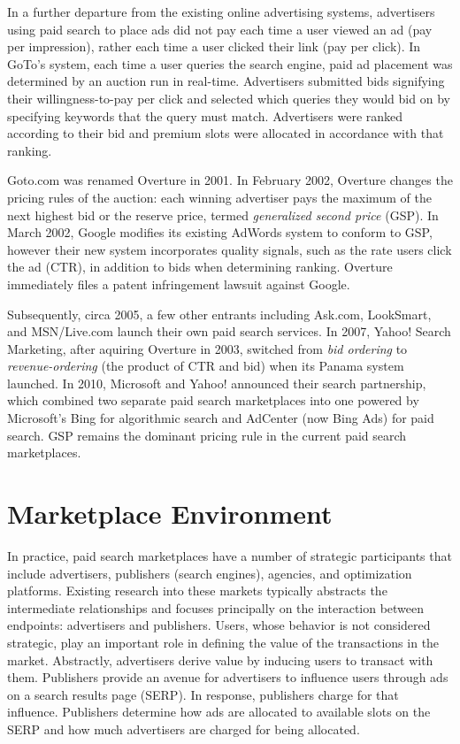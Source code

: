 \documentclass[prodmode,acmtist]{acmsmall} %
\begin{document}
In a further departure from the existing online advertising systems, advertisers using paid search to place ads did not pay each time a user viewed an ad (pay per impression), rather each time a user clicked their link (pay per click).
In GoTo's system, each time a user queries the search engine, paid ad placement was determined by an auction run in real-time.
Advertisers submitted bids signifying their willingness-to-pay per click and selected which queries they would bid on by specifying keywords that the query must match.
Advertisers were ranked according to their bid and premium slots were allocated in accordance with that ranking. 

Goto.com was renamed Overture in 2001.
In February 2002, Overture changes the pricing rules of the auction: each winning advertiser pays the maximum of the next highest bid or the reserve price, termed \emph{generalized second price} (GSP).
In March 2002, Google modifies its existing AdWords system to conform to GSP, however their new system incorporates quality signals, such as the rate users click the ad (CTR), in addition to bids when determining ranking. 
Overture immediately files a patent infringement lawsuit against Google.


Subsequently, circa 2005, a few other entrants including Ask.com, LookSmart, and MSN/Live.com launch their own paid search services.
In 2007, Yahoo! Search Marketing, after aquiring Overture in 2003, switched from \emph{bid ordering} to \emph{revenue-ordering} (the product of CTR and bid) when its Panama system launched. 
In 2010, Microsoft and Yahoo! announced their search partnership, which combined two separate paid search marketplaces into one powered by Microsoft's Bing for algorithmic search and AdCenter (now Bing Ads) for paid search. 
GSP remains the dominant pricing rule in the current paid search marketplaces.


\section{Marketplace Environment} %
\label{sec:paid_search_marketplace}

In practice, paid search marketplaces have a number of strategic participants that include advertisers, publishers (search engines), agencies, and optimization platforms.  
Existing research into these markets typically abstracts the intermediate relationships and focuses principally on the interaction between endpoints: advertisers and publishers.  
Users, whose behavior is not considered strategic, play an important role in defining the value of the transactions in the market. 
Abstractly, advertisers derive value by inducing users to transact with them.  
Publishers provide an avenue for advertisers to influence users through ads on a search results page (SERP).  
In response, publishers charge for that influence.  
Publishers determine how ads are allocated to available slots on the SERP and how much advertisers are charged for being allocated. 
\end{document}
